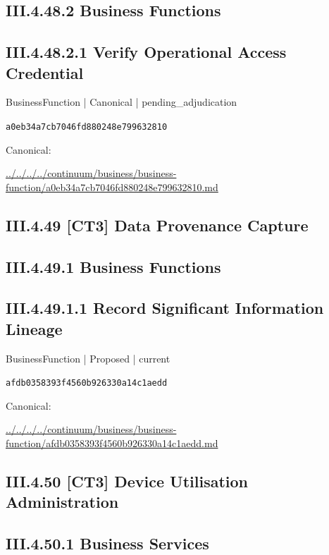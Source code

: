 \documentclass[10pt,a4paper]{article}
\begin{document}
\subsection*{III.4.48.2 Business Functions}
\subsection*{III.4.48.2.1 Verify Operational Access Credential}
{\small BusinessFunction | Canonical | pending\_adjudication}\par
\texttt{a0eb34a7cb7046fd880248e799632810}\par
Canonical: \par
{\footnotesize\url{../../../../continuum/business/business-function/a0eb34a7cb7046fd880248e799632810.md}}\par
\subsection*{III.4.49 [CT3] Data Provenance Capture}
\subsection*{III.4.49.1 Business Functions}
\subsection*{III.4.49.1.1 Record Significant Information Lineage}
{\small BusinessFunction | Proposed | current}\par
\texttt{afdb0358393f4560b926330a14c1aedd}\par
Canonical: \par
{\footnotesize\url{../../../../continuum/business/business-function/afdb0358393f4560b926330a14c1aedd.md}}\par
\subsection*{III.4.50 [CT3] Device Utilisation Administration}
\subsection*{III.4.50.1 Business Services}
\end{document}
